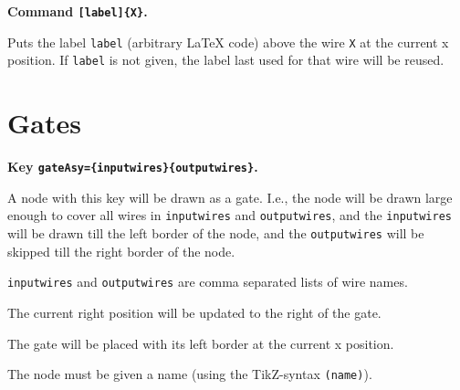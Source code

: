\documentclass[a4paper]{article}
\makeatletter
\newenvironment{command}[2]{%
  \medskip\noindent\textbf{Command \macroanchor#1\texttt{#2}.} 
}{%
}
\newenvironment{key}[2]{%
  \medskip\noindent\textbf{Key \keyanchor{#1}\texttt{#2}.} 
}{%
}
\newcommand\nobsstring[1]{{\escapechar=-1\xdef\@tempa{\string#1}}}
\DeclareRobustCommand\macroanchor[1]{\nobsstring#1\label{command-\@tempa}\texttt{\string#1}}
\DeclareRobustCommand\keyanchor[1]{\label{key-#1}\texttt{#1}}
\makeatother
\begin{document}
\begin{command}{[label]\{X\}}
  Puts the label \texttt{label} (arbitrary LaTeX code) above the wire
  \texttt{X} at the current x position. If \texttt{label} is not
  given, the label last used for that wire will be reused.

  
\begin{example}
\end{example}
\end{command}

\section{Gates}
\label{sec:gates}


\begin{key}{gateAsy}{=\{inputwires\}\{outputwires\}}
  A node with this key will be drawn as a gate. I.e., the node will be
  drawn large enough to cover all wires in \texttt{inputwires} and
  \texttt{outputwires}, and the \texttt{inputwires} will be drawn till
  the left border of the node, and the \texttt{outputwires} will be
  skipped till the right border of the node.

  \texttt{inputwires} and \texttt{outputwires} are comma separated
  lists of wire names.

  The current right position will be updated to the right of the gate.

  The gate will be placed with its left border at the current x
  position.

  The node must be given a name (using the TikZ-syntax
  \texttt{(name)}).

\begin{example}
\end{example}
\end{key}
\end{document}

